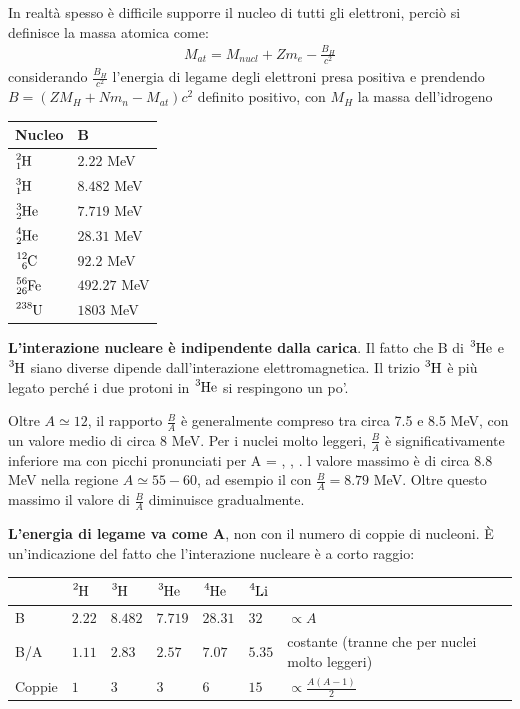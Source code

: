 \documentclass[a4paper,11pt,twoside,openany]{book}
\theoremstyle{definition}
\theoremstyle{plain}
\theoremstyle{plain}
\theoremstyle{definition}
\begin{document}
In realtà spesso è difficile supporre il nucleo di tutti gli elettroni, perciò si definisce la massa atomica come:
\begin{equation}\begin{split}
M_{at}=M_{nucl}+Zm_e-\frac{B_{H}}{c^2}
\end{split}\end{equation}
considerando $\frac{B_{H}}{c^2}$ l'energia di legame degli elettroni presa positiva e prendendo $B=\left(ZM_H+Nm_n-M_{at}\right)c^2$ definito positivo, con $M_H$ la massa dell'idrogeno

\begin{center}\begin{tabularx}{2in}{XX}
\toprule
Nucleo & B \\
\midrule
$\ce{^2_1H}$ & $2.22$ MeV \\
$\ce{^3_1H}$ & $8.482$ MeV \\
$\ce{^3_2He}$ & $7.719$ MeV \\
$\ce{^4_2He}$ & $28.31$ MeV \\
$\ce{^{12}_6C}$ & $92.2$ MeV \\
$\ce{^{56}_{26}Fe}$ & $492.27$ MeV \\
$\ce{^{238}U}$ & $1803$ MeV \\
\bottomrule
\end{tabularx}\end{center}

\textbf{L'interazione nucleare è indipendente dalla carica}. Il fatto che B di $\ce{^3He}$ e $\ce{^3H}$ siano diverse dipende dall'interazione elettromagnetica. Il trizio $\ce{^3H}$ è più legato perché i due protoni in $\ce{^3He}$ si respingono un po'.

Oltre $A\simeq 12$, il rapporto $\frac{B}{A}$ è generalmente compreso tra circa 7.5 e 8.5 MeV, con un valore medio di circa 8 MeV. Per i nuclei molto leggeri, $\frac{B}{A}$ è significativamente inferiore ma con picchi pronunciati per A = , , . l valore massimo è di circa 8.8 MeV nella regione $A\simeq 55-60$, ad esempio il  con $\frac{B}{A}=8.79$ MeV. Oltre questo massimo il valore di $\frac{B}{A}$ diminuisce gradualmente.

\textbf{L'energia di legame va come A}, non con il numero di coppie di nucleoni. È un'indicazione del fatto che l'interazione nucleare è a corto raggio:

\begin{center}\begin{tabularx}{\textwidth}{XXXXXXX}
\toprule
& $\ce{^2H}$ & $\ce{^3H}$ & $\ce{^3He}$ & $\ce{^4He}$ & $\ce{^4Li}$ & \\
\midrule
B & $2.22$ & $8.482$ & $7.719$ & $28.31$ & $32$ & $\propto A$ \\
B/A & $1.11$ & $2.83$ & $2.57$ & $7.07$ & $5.35$ & costante (tranne che per nuclei molto leggeri) \\
Coppie & $1$ & $3$ & $3$ & $6$ & $15$ & $\propto \frac{A(A-1)}{2}$ \\
\bottomrule
\end{tabularx}\end{center}
\end{document}
